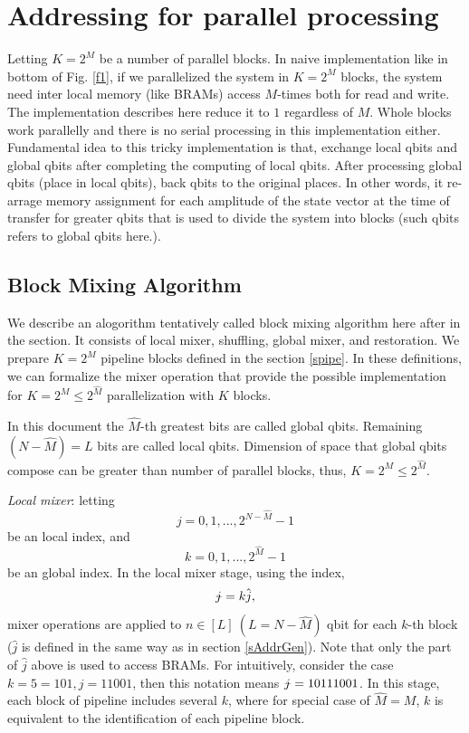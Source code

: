 \documentclass[a4paper]{article}
\newcommand{\MidBar}[1]{{\ooalign{\hfil$#1$\hfil\cr\kern0.08em--\hfil\cr}}}
\newcommand{\hatj}{{\hat{j}}}
\newcommand{\jbar}{{\MidBar{j}}}
\newcommand{\hatM}{{\hat{M}}}
\begin{document}
\section{Addressing for parallel processing}
Letting \(K=2^M\) be a number of parallel blocks. In naive implementation like in bottom of Fig. \ref{f1}, if we parallelized the system in \(K=2^M\) blocks, the system need inter local memory (like BRAMs) access \(M\)-times both for read and write. The implementation describes here reduce it to \(1\) regardless of \(M\). Whole blocks work parallelly and there is no serial processing in this implementation either. Fundamental idea to this tricky implementation is that, exchange local qbits and global qbits after completing the computing of local qbits. After processing global qbits (place in local qbits), back qbits to the original places. In other words, it re-arrage memory assignment for each amplitude of the state vector at the time of transfer for greater qbits that is used to divide the system into blocks (such qbits refers to global qbits here.).



\subsection{Block Mixing Algorithm} 
\label{sBMA}
We describe an alogorithm tentatively called block mixing algorithm here after in the section. It consists of local mixer, shuffling, global mixer, and restoration.
We prepare \(K = 2^M\) pipeline blocks defined in the section \ref{spipe}.  
In these definitions, we can formalize the mixer operation that provide the possible implementation for \(K = 2^M \leq 2^\hatM\) parallelization with \(K\) blocks. 

In this document the \(\hatM\)-th greatest bits are called global qbits. Remaining \((N-\hatM)=L\) bits are called local qbits. Dimension of space that global qbits compose can be greater than number of parallel blocks, thus, \(K = 2^M \leq 2^\hatM\).

\textit{Local mixer}: letting 
\[j=0,1,...,2^{N-\hatM}-1\]
 be an local index, 
and \[k=0,1,...,2^{\hatM}-1\]
 be an global index. In the local mixer stage, using the index,
\[
\jbar = k\hatj,
\]
mixer operations are applied to \(n\in[L]\ (L=N-\hatM)\) qbit for each \(k\)-th block (\(\hatj\) is defined in the same way as in section \ref{sAddrGen}). Note that only the part of \(\hatj\) above is used to access BRAMs. For intuitively, consider the case \(k = 5=101, j=11001\), then this notation means \(\jbar = 10111001\). 
In this stage, each block of pipeline includes several \(k\), where for special case of \(\hatM = M\), \(k\) is equivalent to the identification of each pipeline block.
\end{document}
